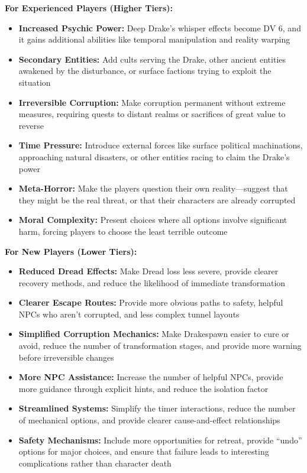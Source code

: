\documentclass[11pt]{article}
\begin{document}
\textbf{For Experienced Players (Higher Tiers):}
\begin{itemize}
\item \textbf{Increased Psychic Power:} Deep Drake's whisper effects become DV 6, and it gains additional abilities like temporal manipulation and reality warping
\item \textbf{Secondary Entities:} Add cults serving the Drake, other ancient entities awakened by the disturbance, or surface factions trying to exploit the situation
\item \textbf{Irreversible Corruption:} Make corruption permanent without extreme measures, requiring quests to distant realms or sacrifices of great value to reverse
\item \textbf{Time Pressure:} Introduce external forces like surface political machinations, approaching natural disasters, or other entities racing to claim the Drake's power
\item \textbf{Meta-Horror:} Make the players question their own reality---suggest that they might be the real threat, or that their characters are already corrupted
\item \textbf{Moral Complexity:} Present choices where all options involve significant harm, forcing players to choose the least terrible outcome
\end{itemize}

\textbf{For New Players (Lower Tiers):}
\begin{itemize}
\item \textbf{Reduced Dread Effects:} Make Dread loss less severe, provide clearer recovery methods, and reduce the likelihood of immediate transformation
\item \textbf{Clearer Escape Routes:} Provide more obvious paths to safety, helpful NPCs who aren't corrupted, and less complex tunnel layouts
\item \textbf{Simplified Corruption Mechanics:} Make Drakespawn easier to cure or avoid, reduce the number of transformation stages, and provide more warning before irreversible changes
\item \textbf{More NPC Assistance:} Increase the number of helpful NPCs, provide more guidance through explicit hints, and reduce the isolation factor
\item \textbf{Streamlined Systems:} Simplify the timer interactions, reduce the number of mechanical options, and provide clearer cause-and-effect relationships
\item \textbf{Safety Mechanisms:} Include more opportunities for retreat, provide ``undo'' options for major choices, and ensure that failure leads to interesting complications rather than character death
\end{itemize}
\end{document}
